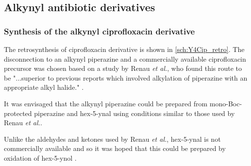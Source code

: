 \subsection{Alkynyl antibiotic derivatives}

\subsubsection{Synthesis of the alkynyl ciprofloxacin derivative }




The retrosynthesis of ciprofloxacin derivative  is shown in \ref{sch:Y4Cip_retro}. The disconnection to an alkynyl piperazine  and a commercially available ciprofloxacin precursor  was chosen based on a study by Renau \textit{et al.}, who found this route to be "...superior to previous reports which involved alkylation of piperazine with an appropriate alkyl halide." \cite{Renau1996,JPS:JPS2600571210}. 

It was envisaged that the alkynyl piperazine  could be prepared from mono-Boc-protected piperazine  and hex-5-ynal  using conditions similar to those used by Renau \textit{et al.}\cite{Renau1996}.

Unlike the aldehydes and ketones used by Renau \textit{et al.}\cite{Renau1996}, hex-5-ynal  is not commercially available and so it was hoped that this could be prepared by oxidation of hex-5-ynol .



